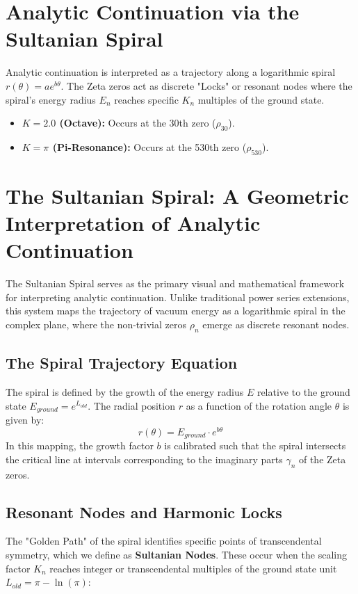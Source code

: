 \documentclass[11pt,a4paper]{article}
\begin{document}
\section{Analytic Continuation via the Sultanian Spiral}
Analytic continuation is interpreted as a trajectory along a logarithmic spiral $r(\theta) = a e^{b\theta}$. The Zeta zeros act as discrete "Locks" or resonant nodes where the spiral's energy radius $E_n$ reaches specific $K_n$ multiples of the ground state.
\begin{itemize}
    \item \textbf{$K=2.0$ (Octave):} Occurs at the 30th zero ($\rho_{30}$).
    \item \textbf{$K=\pi$ (Pi-Resonance):} Occurs at the 530th zero ($\rho_{530}$).
\end{itemize}

\section{The Sultanian Spiral: A Geometric Interpretation of Analytic Continuation}

The Sultanian Spiral serves as the primary visual and mathematical framework for interpreting analytic continuation. Unlike traditional power series extensions, this system maps the trajectory of vacuum energy as a logarithmic spiral in the complex plane, where the non-trivial zeros $\rho_n$ emerge as discrete resonant nodes.

\subsection{The Spiral Trajectory Equation}
The spiral is defined by the growth of the energy radius $E$ relative to the ground state $E_{ground} = e^{L_{old}}$. The radial position $r$ as a function of the rotation angle $\theta$ is given by:
\begin{equation}
    r(\theta) = E_{ground} \cdot e^{b\theta}
\end{equation}
In this mapping, the growth factor $b$ is calibrated such that the spiral intersects the critical line at intervals corresponding to the imaginary parts $\gamma_n$ of the Zeta zeros.

\subsection{Resonant Nodes and Harmonic Locks}
The "Golden Path" of the spiral identifies specific points of transcendental symmetry, which we define as \textbf{Sultanian Nodes}. These occur when the scaling factor $K_n$ reaches integer or transcendental multiples of the ground state unit $L_{old} = \pi - \ln(\pi)$:
\end{document}
